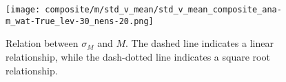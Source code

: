\documentclass[a4paper, 12pt]{article}
\begin{document}
\begin{figure}[ht]
\noindent \centering
\texttt{[image: composite/m/std\_v\_mean/std\_v\_mean\_composite\_ana-m\_wat-True\_lev-30\_nens-20.png]}\\
\caption{Relation between $\sigma_M$ and $M$. The dashed line indicates a linear relationship, while the dash-dotted line indicates a square root relationship.} \label{fig:comp_std_v_mean}
\end{figure}

% 
\end{document}
